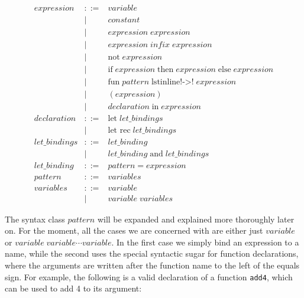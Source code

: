 \begin{eqnarray*}
expression    & ::= & variable       \\
              & |   & constant                                                  \\
              & |   & expression \; expression                                  \\
              & |   & expression \; infix \; expression                         \\
              & |   & \mbox{not} \; expression                                  \\
              & |   & \mbox{if} \; expression \; \mbox{then} \; expression \; \mbox{else} \; expression  \\
              & |   & \mbox{fun} \; pattern \; \mbox{lstinline!->!} \; expression \\
              & |   & ( expression )                                            \\
              & |   & declaration \; \mbox{in} \; expression                    \\
declaration   & ::= & \mbox{let} \; let\_bindings \;                            \\
              & |   & \mbox{let rec} \; let\_bindings \;                        \\
let\_bindings & ::= & let\_binding                                              \\
              & |   & let\_binding \; \mbox{and} \; let\_bindings               \\
let\_binding  & ::= & pattern \; \mbox{=} \; expression                         \\
pattern       & ::= & variables                                                 \\
variables     & ::= & variable                                                  \\
              & |   & variable \; variables
\end{eqnarray*}

The syntax class $pattern$ will be expanded and explained more thoroughly later
on. For the moment, all the cases we are concerned with are either just
$variable$ or $variable \; variable \cdots variable$. In the first case we
simply bind an expression to a name, while the second uses the special
syntactic sugar for function declarations, where the arguments are written
after the function name to the left of the equals sign. For example, the
following is a valid declaration of a function {\tt add4}, which can be used to
add 4 to its argument:

